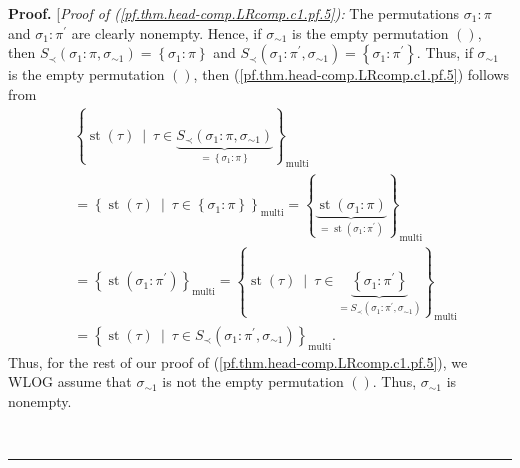 \documentclass[numbers=enddot,12pt,final,onecolumn,notitlepage]{scrartcl}%
\theoremstyle{definition}
\newenvironment{proof}[1][Proof]{\noindent\textbf{#1.} }{\ \rule{0.5em}{0.5em}}
\begin{document}
\begin{proof}
[\textit{Proof of (\ref{pf.thm.head-comp.LRcomp.c1.pf.5}):} The permutations
$\sigma_{1}:\pi$ and $\sigma_{1}:\pi^{\prime}$ are clearly nonempty. Hence, if
$\sigma_{\sim1}$ is the empty permutation $\left(  {}\right)  $, then
$S_{\prec}\left(  \sigma_{1}:\pi,\sigma_{\sim1}\right)  =\left\{  \sigma
_{1}:\pi\right\}  $ and $S_{\prec}\left(  \sigma_{1}:\pi^{\prime},\sigma
_{\sim1}\right)  =\left\{  \sigma_{1}:\pi^{\prime}\right\}  $. Thus, if
$\sigma_{\sim1}$ is the empty permutation $\left(  {}\right)  $, then
(\ref{pf.thm.head-comp.LRcomp.c1.pf.5}) follows from%
\begin{align*}
&  \left\{  \operatorname*{st}\left(  \tau\right)  \ \mid\ \tau\in
\underbrace{S_{\prec}\left(  \sigma_{1}:\pi,\sigma_{\sim1}\right)
}_{=\left\{  \sigma_{1}:\pi\right\}  }\right\}  _{\operatorname*{multi}}\\
&  =\left\{  \operatorname*{st}\left(  \tau\right)  \ \mid\ \tau\in\left\{
\sigma_{1}:\pi\right\}  \right\}  _{\operatorname*{multi}}=\left\{
\underbrace{\operatorname*{st}\left(  \sigma_{1}:\pi\right)  }%
_{=\operatorname*{st}\left(  \sigma_{1}:\pi^{\prime}\right)  }\right\}
_{\operatorname*{multi}}\\
&  =\left\{  \operatorname*{st}\left(  \sigma_{1}:\pi^{\prime}\right)
\right\}  _{\operatorname*{multi}}=\left\{  \operatorname*{st}\left(
\tau\right)  \ \mid\ \tau\in\underbrace{\left\{  \sigma_{1}:\pi^{\prime
}\right\}  }_{=S_{\prec}\left(  \sigma_{1}:\pi^{\prime},\sigma_{\sim1}\right)
}\right\}  _{\operatorname*{multi}}\\
&  =\left\{  \operatorname*{st}\left(  \tau\right)  \ \mid\ \tau\in S_{\prec
}\left(  \sigma_{1}:\pi^{\prime},\sigma_{\sim1}\right)  \right\}
_{\operatorname*{multi}}.
\end{align*}
Thus, for the rest of our proof of (\ref{pf.thm.head-comp.LRcomp.c1.pf.5}), we
WLOG assume that $\sigma_{\sim1}$ is not the empty permutation $\left(
{}\right)  $. Thus, $\sigma_{\sim1}$ is nonempty.


\end{proof}
\end{document}
